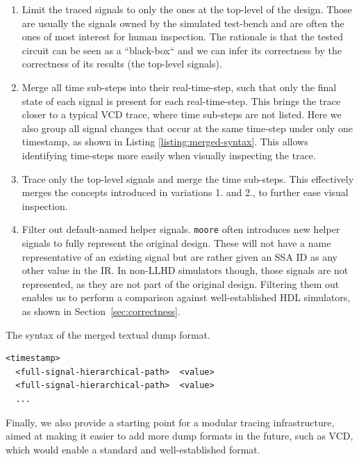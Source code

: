 \begin{enumerate}
    \item Limit the traced signals to only the ones at the top-level of the design. Those are usually the signals owned by the simulated test-bench and are often the ones of most interest for human inspection. The rationale is that the tested circuit can be seen as a “black-box“ and we can infer its correctness by the correctness of its results (the top-level signals).
    \item Merge all time sub-steps into their real-time-step, such that only the final state of each signal is present for each real-time-step. This brings the trace closer to a typical VCD trace, where time sub-steps are not listed. Here we also group all signal changes that occur at the same time-step under only one timestamp, as shown in Listing \ref{listing:merged-syntax}. This allows identifying time-steps more easily when visually inspecting the trace.
    \item Trace only the top-level signals and merge the time sub-steps. This effectively merges the concepts introduced in variations 1. and 2., to further ease visual inspection.
    \item Filter out default-named helper signals. \texttt{moore} often introduces new helper signals to fully represent the original design. These will not have a name representative of an existing signal but are rather given an SSA ID as any other value in the IR. In non-LLHD simulators though, those signals are not represented, as they are not part of the original design. Filtering them out enables us to perform a comparison against well-established HDL simulators, as shown in Section~\ref{sec:correctness}.
\end{enumerate}

\begin{listing}
    \caption{The syntax of the merged textual dump format.}
    \label{listing:merged-syntax}
    \centering
    \begin{minipage}{0.6\textwidth}
        \begin{verbatim}
<timestamp>
  <full-signal-hierarchical-path>  <value>
  <full-signal-hierarchical-path>  <value>
  ...
            \end{verbatim}
    \end{minipage}
\end{listing}

Finally, we also provide a starting point for a modular tracing infrastructure, aimed at making it easier to add more dump formats in the future, such as VCD, which would enable a standard and well-established format.



